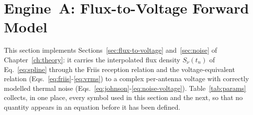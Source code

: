 \section{Engine~A: Flux-to-Voltage Forward Model}
\label{sec:voltage-synth}

This section implements Sections~\ref{sec:flux-to-voltage}
and~\ref{sec:noise} of Chapter~\ref{ch:theory}: it carries the interpolated
flux density $S_\nu(t_n)$ of Eq.~\eqref{eq:spline} through the Friis
reception relation and the voltage-equivalent relation
(Eqs.~\eqref{eq:friis}-\eqref{eq:vrms}) to a complex per-antenna voltage with
correctly modelled thermal noise (Eqs.~\eqref{eq:johnson}-\eqref{eq:noise-voltage}).
Table~\ref{tab:params} collects, in one place, every symbol used in this
section and the next, so that no quantity appears in an equation before it
has been defined.

